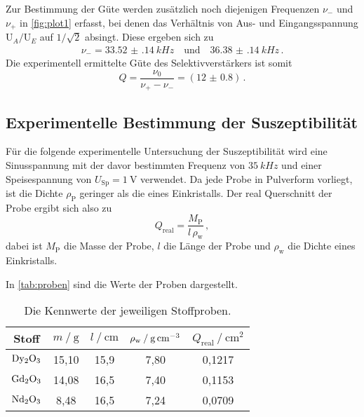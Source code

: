 Zur Bestimmung der Güte werden zusätzlich noch diejenigen Frequenzen $\nu_{-}$ und $\nu_{+}$ in \autoref{fig:plot1} erfasst,
bei denen das Verhältnis von Aus- und Eingangsspannung $\text{U}_{A} / \text{U}_{E}$ auf $1/\sqrt{2}$ absingt.
Diese ergeben sich zu
\begin{align*}
  \nu_{-} = \qty{33.52(14)}{kHz} \quad \text{und} \quad \qty{36.38(14)}{kHz} \, .
\end{align*}
Die experimentell ermittelte Güte des Selektivverstärkers ist somit
\begin{equation}
  Q = \frac{\nu_0}{\nu_{+} - \nu_{-}} = (\num{12(0.8)}) \, .
\end{equation}


\subsection{Experimentelle Bestimmung der Suszeptibilität}

Für die folgende experimentelle Untersuchung der Suszeptibilität wird eine Sinusspannung 
mit der davor bestimmten Frequenz von $\qty{35}{kHz}$ und einer Speisespannung von $U_\text{Sp} = \qty{1}{\volt}$ verwendet.
Da jede Probe in Pulverform vorliegt, ist die Dichte $\rho_\text{P}$ geringer als die eines Einkristalls.
Der real Querschnitt der Probe ergibt sich also zu
\begin{equation}
  Q_\text{real} = \frac{M_\text{P}}{l \, \rho_\text{w}} \, ,
\end{equation}
dabei ist $M_\text{P}$ die Masse der Probe, $l$ die Länge der Probe und $\rho_\text{w}$ die Dichte eines Einkristalls.

In \autoref{tab:proben} sind die Werte der Proben dargestellt.
\begin{table}
  \centering
  \caption{Die Kennwerte der jeweiligen Stoffproben.}
  \label{tab:proben}
  \begin{tabular}{c c c c c}
    \toprule
    Stoff &   
    $m \mathbin{/} \mathrm{g}$ &
    $l \mathbin{/} \mathrm{cm}$ &
    $\rho_\text{w} \mathbin{/} \unit[per-mode=reciprocal]{\gram\per\cubic\centi\meter}$ & 
    $Q_\text{real} \mathbin{/} \unit{\centi\meter\squared}$ \\
    \midrule
    $\ce{Dy2O3}$ & 15,10 &  15,9 & 7,80 & 0,1217 \\
    $\ce{Gd2O3}$ & 14,08 &  16,5 & 7,40 & 0,1153 \\
    $\ce{Nd2O3}$ &  8,48 &  16,5 & 7,24 & 0,0709 \\
    \bottomrule
  \end{tabular}
\end{table}

